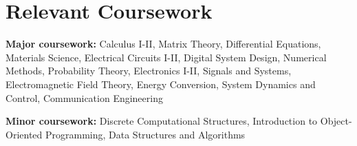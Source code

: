 \documentclass[letterpaper,11pt]{article}
\makeatletter
\newcommand{\resumeOrganizationHeading}[4]{
  \vspace{-2pt}\item
    \begin{tabular*}{0.97\textwidth}[t]{l@{\extracolsep{\fill}}r}
      \textbf{#1} & \textit{\small #2} \\
      \textit{\small#3}
    \end{tabular*}\vspace{-7pt}
}
\newcommand{\resumeSubHeadingListStart}{\begin{itemize}[leftmargin=0.15in, label={}]}
\newcommand{\resumeSubHeadingListEnd}{\end{itemize}}
\makeatother
\begin{document}
\section{Relevant Coursework}
  \vspace{2pt}
  \resumeSubHeadingListStart{}
    \small{\item{%
        \textbf{Major coursework:} {Calculus I-II, Matrix Theory, Differential Equations, Materials Science, Electrical Circuits I-II, Digital System Design, Numerical Methods, Probability Theory, Electronics I-II, Signals and Systems, Electromagnetic Field Theory, Energy Conversion, System Dynamics and Control, Communication Engineering} \\ \vspace{3pt}

        \textbf{Minor coursework:} {Discrete Computational Structures, Introduction to Object-Oriented Programming, Data Structures and Algorithms}
    }}
  \resumeSubHeadingListEnd{}
























\end{document}
